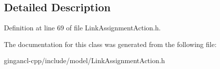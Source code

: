 \subsection{Detailed Description}




Definition at line 69 of file LinkAssignmentAction.h.

The documentation for this class was generated from the following file:\begin{CompactItemize}
\item 
gingancl-cpp/include/model/LinkAssignmentAction.h\end{CompactItemize}
